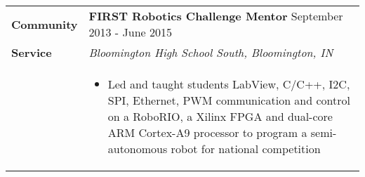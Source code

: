 \documentclass{article}[16pt]
\newlength{\lcolw}
\newlength{\rcolw}
\newlength{\hlcolw}
\newlength{\itemmargin}
\begin{document}

%





\begin{tabular}{L{\hlcolw}  L{\rcolw}}
\textbf{\Large Community} & \textbf{\large FIRST Robotics Challenge Mentor } \hfill {\large September 2013 - June 2015}  \\
\textbf{\Large Service} & \textit{\large Bloomington High School South, Bloomington, IN} \vspace{0.05in}  \\
& 
\vspace{-0.2in} 
\begin{itemize}[leftmargin = \itemmargin]
	\item Led and taught students LabView, C/C++, I2C, SPI, Ethernet, PWM communication and control on a RoboRIO, a Xilinx FPGA and dual-core ARM Cortex-A9 processor to program a semi-autonomous robot for national competition
\end{itemize} \\
	\hline \hline
\end{tabular}
\end{document}

